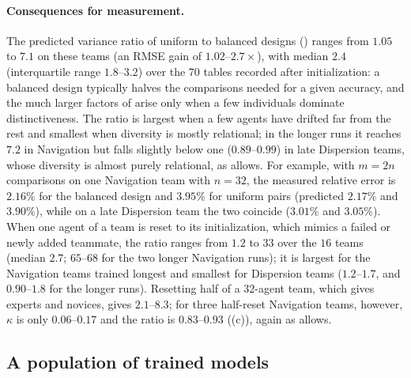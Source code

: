 \documentclass[twoside,11pt]{article}
\begin{document}
\paragraph{Consequences for measurement.}
The predicted variance ratio of uniform to balanced designs
() ranges from $1.05$ to $7.1$ on these teams (an RMSE
gain of $1.02$--$2.7\times$), with median $2.4$ (interquartile range
$1.8$--$3.2$) over the $70$ tables recorded after initialization: a balanced
design typically halves the comparisons needed for a given accuracy, and the
much larger factors of  arise only when a few individuals
dominate distinctiveness. The ratio is largest when a few agents have drifted
far from the rest and smallest when diversity is mostly relational; in the
longer runs it reaches $7.2$ in Navigation but falls slightly below one
($0.89$--$0.99$) in late Dispersion teams, whose diversity is almost purely
relational, as  allows. For example, with $m=2n$
comparisons on one Navigation team with $n=32$, the measured relative error is
$2.16\%$ for the balanced design and $3.95\%$ for uniform pairs (predicted
$2.17\%$ and $3.90\%$), while on a late Dispersion team the two coincide
($3.01\%$ and $3.05\%$). When one agent of a team is reset to its
initialization, which mimics a failed or newly added teammate, the ratio
ranges from $1.2$ to $33$ over the $16$ teams (median $2.7$; $65$--$68$ for
the two longer Navigation runs); it is largest for the Navigation teams
trained longest and smallest for Dispersion teams ($1.2$--$1.7$, and
$0.90$--$1.8$ for the longer runs). Resetting half of a $32$-agent team,
which gives experts and novices, gives $2.1$--$8.3$; for three half-reset
Navigation teams, however, $\kappa$ is only $0.06$--$0.17$ and the ratio is
$0.83$--$0.93$ ((c)), again as  allows.

\subsection{A population of trained models}
\label{sec:exp-zoo}
\end{document}
